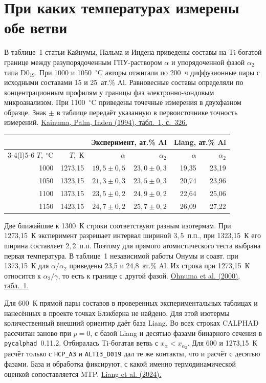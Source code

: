 \documentclass[11pt,a4paper]{article}
\begin{document}
\clearpage

\section*{При каких температурах измерены обе ветви}
В таблице~1 статьи Кайнумы, Пальма и Индена приведены составы на
Ti-богатой границе между разупорядоченным ГПУ-раствором \(\alpha\) и
упорядоченной фазой \(\alpha_2\) типа D0$_{19}$.
При 1000 и 1050~\(^\circ\)C авторы отжигали по 200~ч диффузионные пары
с исходными составами 15 и 25~ат.\% Al. Равновесные составы определяли
по концентрационным профилям у границы фаз электронно-зондовым
микроанализом. При 1100~\(^\circ\)C приведены точечные измерения в
двухфазном образце. Знак \(\pm\) в таблице передаёт указанную в
первоисточнике точность измерений.
\href{https://doi.org/10.1016/0966-9795(94)90018-3}{Kainuma, Palm, Inden (1994), табл.~1, с.~326.}

\begin{center}\small
\begin{tabular}{@{}rrrrrr@{}}
\toprule
&&\multicolumn{2}{c}{Эксперимент, ат.\% Al}&
\multicolumn{2}{c}{Liang, ат.\% Al}\\
\cmidrule(lr){3-4}\cmidrule(l){5-6}
\(T,\ ^\circ\)C & \(T,\) К & \(\alpha\) & \(\alpha_2\) & \(\alpha\) & \(\alpha_2\)\\
\midrule
1000 & 1273,15 & \(19{,}5\pm0{,}5\) & \(23{,}0\pm0{,}3\) & 19,35 & 23,19\\
1050 & 1323,15 & \(21{,}3\pm0{,}3\) & \(23{,}5\pm0{,}3\) & 20,74 & 23,96\\
1100 & 1373,15 & \(23{,}5\pm0{,}2\) & \(24{,}9\pm0{,}2\) & 22,64 & 25,06\\
1150 & 1423,15 & \(24{,}7\pm0{,}2\) & \(25{,}7\pm0{,}2\) & 26,09 & 27,22\\
\bottomrule
\end{tabular}
\end{center}
Две ближайшие к 1300~К строки соответствуют разным изотермам. При
1273,15~К эксперимент разрешает интервал шириной \(3{,}5\)~п.п., при
1323,15~К его ширина составляет \(2{,}2\)~п.п. Поэтому для прямого
атомистического теста выбрана первая температура. В таблице~1 независимой
работы Онумы и соавт. при 1373,15~К для \(\alpha/\alpha_2\) приведены
23,5 и 24,8~ат.\% Al. Их строка при 1273,15~К относится к
\(\alpha_2/\gamma\), то есть к границе с другой фазой.
\href{https://doi.org/10.1016/S1359-6454(00)00118-X}{Ohnuma et al. (2000), табл.~1.}

Для 600~К прямой пары составов в проверенных экспериментальных
таблицах и нанесённых в проекте точках Блэкберна не найдено.
Для этой изотермы количественный внешний ориентир даёт база Liang.
Во всех строках CALPHAD рассчитан заново при \(p=0\), с базой Liang
и десятью фазами бинарного сечения в \texttt{pycalphad}~0.11.2.
Отбиралась Ti-богатая ветвь с \(x_\alpha<x_{\alpha_2}\).
Для 600 и 1273,15~К расчёт только с \texttt{HCP\_A3} и
\texttt{ALTI3\_D019} дал те же контакты, что и расчёт с десятью фазами.
База и обработка фиксируют, с какой именно термодинамической оценкой
сопоставляется MTP. \href{https://doi.org/10.1007/s11669-024-01124-9}{Liang et al. (2024).}
\end{document}
